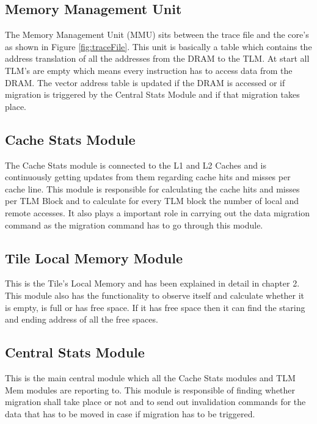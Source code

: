 \documentclass{listhesis}
\begin{document}
\subsection{Memory Management Unit}
The Memory Management Unit (MMU) sits between the trace file and the core's as shown in Figure \ref{fig:traceFile}. This unit is basically a table which contains the address translation of all the addresses from the DRAM to the TLM. At start all TLM's are empty which means every instruction has to access data from the DRAM. The vector address table is updated if the DRAM is accessed or if migration is triggered by the Central Stats Module and if that migration takes place.
\subsection{Cache Stats Module}
The Cache Stats module is connected to the L1 and L2 Caches and is continuously getting updates from them regarding cache hits and misses per cache line. This module is responsible for calculating the cache hits and misses per TLM Block and to calculate for every TLM block the number of local and remote accesses. It also plays a important role in carrying out the data migration command as the migration command has to go through this module. 
\subsection{Tile Local Memory Module}
This is the Tile's Local Memory and has been explained in detail in chapter 2. This module also has the functionality to observe itself and calculate whether it is empty, is full or has free space. If it has free space then it can find the staring and ending address of all the free spaces. 
\subsection{Central Stats Module}
This is the main central module which all the Cache Stats modules and TLM Mem modules are reporting to. This module is responsible of finding whether migration shall take place or not and to send out invalidation commands for the data that has to be moved in case if migration has to be triggered. 
\end{document}
